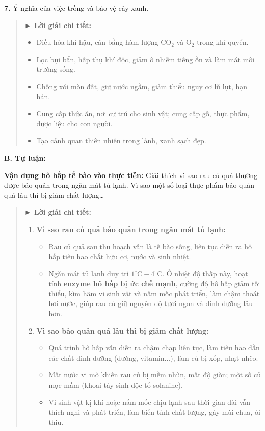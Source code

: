 \documentclass[11pt,a4paper]{article}
\begin{document}
\textbf{7.} Ý nghĩa của việc trồng và bảo vệ cây xanh.

\begin{quote}\small
{\color{myBlue}\textbf{► Lời giải chi tiết:}}
\begin{itemize}[leftmargin=*,itemsep=1pt]
  \item Điều hòa khí hậu, cân bằng hàm lượng $\text{CO}_2$ và $\text{O}_2$ trong khí quyển.
  \item Lọc bụi bẩn, hấp thụ khí độc, giảm ô nhiễm tiếng ồn và làm mát môi trường sống.
  \item Chống xói mòn đất, giữ nước ngầm, giảm thiểu nguy cơ lũ lụt, hạn hán.
  \item Cung cấp thức ăn, nơi cư trú cho sinh vật; cung cấp gỗ, thực phẩm, dược liệu cho con người.
  \item Tạo cảnh quan thiên nhiên trong lành, xanh sạch đẹp.
\end{itemize}
\end{quote}

\vspace{4pt}
{\color{mySub}\textbf{B. Tự luận:}}

\textbf{Vận dụng hô hấp tế bào vào thực tiễn:} Giải thích vì sao rau củ quả thường được bảo quản trong ngăn mát tủ lạnh. Vì sao một số loại thực phẩm bảo quản quá lâu thì bị giảm chất lượng\dots

\begin{quote}\small
{\color{myBlue}\textbf{► Lời giải chi tiết:}}
\begin{enumerate}[leftmargin=*,itemsep=2pt]
  \item \textbf{Vì sao rau củ quả bảo quản trong ngăn mát tủ lạnh:}
    \begin{itemize}
      \item Rau củ quả sau thu hoạch vẫn là tế bào sống, liên tục diễn ra hô hấp tiêu hao chất hữu cơ, nước và sinh nhiệt.
      \item Ngăn mát tủ lạnh duy trì $1^\circ\text{C} - 4^\circ\text{C}$. Ở nhiệt độ thấp này, hoạt tính \textbf{enzyme hô hấp bị ức chế mạnh}, cường độ hô hấp giảm tối thiểu, kìm hãm vi sinh vật và nấm mốc phát triển, làm chậm thoát hơi nước, giúp rau củ giữ nguyên độ tươi ngon và dinh dưỡng lâu hơn.
    \end{itemize}
  \item \textbf{Vì sao bảo quản quá lâu thì bị giảm chất lượng:}
    \begin{itemize}
      \item Quá trình hô hấp vẫn diễn ra chậm chạp liên tục, làm tiêu hao dần các chất dinh dưỡng (đường, vitamin...), làm củ bị xốp, nhạt nhẽo.
      \item Mất nước vi mô khiến rau củ bị mềm nhũn, mất độ giòn; một số củ mọc mầm (khoai tây sinh độc tố solanine).
      \item Vi sinh vật kị khí hoặc nấm mốc chịu lạnh sau thời gian dài vẫn thích nghi và phát triển, làm biến tính chất lượng, gây mùi chua, ôi thiu.
    \end{itemize}
\end{enumerate}
\end{quote}
\end{document}
